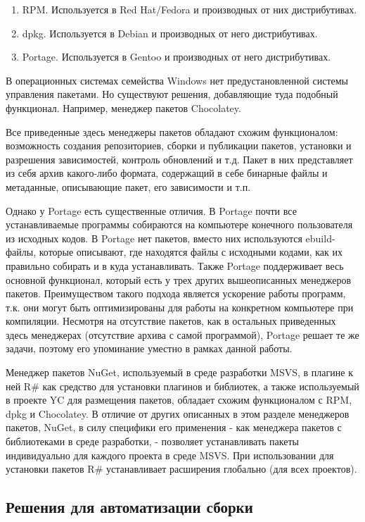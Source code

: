 \documentclass{matmex-diploma-custom}
\begin{document}
\begin{enumerate}
\item
RPM. Используется в Red Hat/Fedora и производных от них дистрибутивах.
\item
dpkg. Используется в Debian и производных от него дистрибутивах.
\item
Portage. Используется в Gentoo и производных от него дистрибутивах.
\end{enumerate}

В операционных системах семейства Windows нет предустановленной системы управления пакетами. Но существуют решения, добавляющие туда подобный функционал. Например, менеджер пакетов Chocolatey.

Все приведенные здесь менеджеры пакетов обладают схожим функционалом: возможность создания репозиториев, сборки и публикации пакетов, установки и разрешения зависимостей, контроль обновлений и т.д. Пакет в них представляет из себя архив какого-либо формата, содержащий в себе бинарные файлы и метаданные, описывающие пакет, его зависимости и т.п.

Однако у Portage есть существенные отличия. В Portage почти все устанавливаемые программы собираются на компьютере конечного пользователя из исходных кодов. В Portage нет пакетов, вместо них используются ebuild-файлы, которые описывают, где находятся файлы с исходными кодами, как их правильно собирать и в куда устанавливать. Также Portage поддерживает весь основной функционал, который есть у трех других вышеописанных менеджеров пакетов. Преимуществом такого подхода является ускорение работы программ, т.к. они могут быть оптимизированы для работы на конкретном компьютере при компиляции. Несмотря на отсутствие пакетов, как в остальных приведенных здесь менеджерах (отсутствие архива с самой программой), Portage решает те же задачи, поэтому его упоминание уместно в рамках данной работы.

Менеджер пакетов NuGet, используемый в среде разработки MSVS, в плагине к ней R\# как средство для установки плагинов и библиотек, а также используемый в проекте YC для размещения пакетов, обладает схожим функционалом с RPM, dpkg и Chocolatey. В отличие от других описанных в этом разделе менеджеров пакетов, NuGet, в силу специфики его применения - как менеджера пакетов с библиотеками в среде разработки, - позволяет устанавливать пакеты индивидуально для каждого проекта в среде MSVS. При использовании для установки пакетов R\# устанавливает расширения глобально (для всех проектов).

\subsection{Решения для автоматизации сборки}
\end{document}
